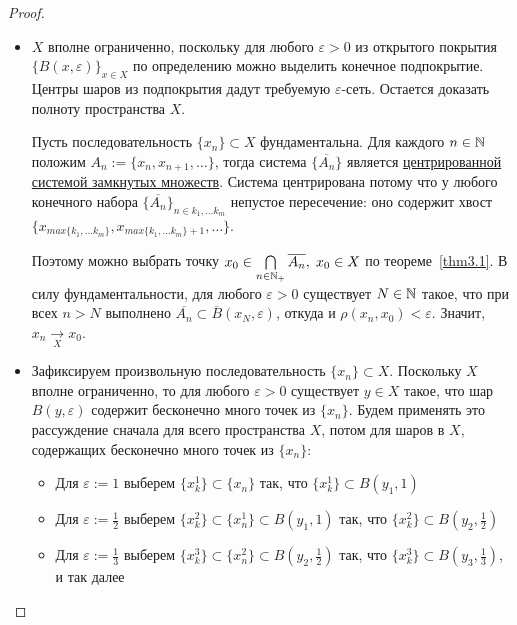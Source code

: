 \begin{proof}~
    \begin{itemize}
        \item{}$X$ вполне ограниченно, поскольку для любого $\varepsilon > 0$ из открытого покрытия $\{B(x, \varepsilon)\}_{x \in X}$ по определению можно выделить конечное подпокрытие. Центры шаров из подпокрытия дадут требуемую $\varepsilon$-сеть. Остается доказать полноту пространства $X$.

        Пусть последовательность $\{x_n\} \subset X$ фундаментальна. Для каждого $n \in \mathbb{N}$ положим $A_n := \{x_n, x_{n+1}, \dotsc \}$, тогда система $\{\overline{A_n}\}$ является \hyperref[center-system]{центрированной системой замкнутых множеств}. Система центрирована потому что у любого конечного набора $\{\overline{A_n}\}_{n \in k_1, \ldots k_m}$ непустое пересечение: оно содержит хвост $\{x_{max\{k_1, \ldots k_m\}}, x_{max\{k_1, \ldots k_m\}+1}, \dotsc \}$.
        
        Поэтому можно выбрать точку $x_0 \in \bigcap\limits_{n \in \mathbb{N}_+} \overline{A_n},\; x_0 \in X$ по теореме~\ref{thm3.1}. В силу фундаментальности, для любого $\varepsilon > 0$ существует $N \in \mathbb{N}$ такое, что при всех $n > N$ выполнено $\overline{A_n} \subset \overline B(x_N, \varepsilon)$, откуда и $\rho(x_n, x_0) < \varepsilon$. Значит, $x_n \xrightarrow[X]{} x_0$.
        
        \item{}Зафиксируем произвольную последовательность $\{x_n\} \subset X$. Поскольку $X$ вполне ограниченно, то для любого $\varepsilon > 0$ существует $y \in X$ такое, что шар $B(y, \varepsilon)$ содержит бесконечно много точек из $\{x_n\}$. Будем применять это рассуждение сначала для всего пространства $X$, потом для шаров в $X$, содержащих бесконечно много точек из $\{x_n\}$:
        \begin{itemize}
            \item[$\bullet$] Для $\varepsilon := 1$ выберем $\{x^1_k\} \subset \{x_n\}$ так, что $\{x^1_k\} \subset B(y_1, 1)$
            \item[$\bullet$] Для $\varepsilon := \frac 12$ выберем $\{x^2_k\} \subset \{x^1_n\} \subset B(y_1, 1)$ так, что $\{x^2_k\} \subset B(y_2, \frac 12)$
            \item[$\bullet$] Для $\varepsilon := \frac 13$ выберем $\{x^3_k\} \subset \{x^2_n\} \subset B(y_2, \frac 12)$ так, что $\{x^3_k\} \subset B(y_3, \frac 13)$, и так далее
        \end{itemize}


\end{itemize}
\end{proof}

